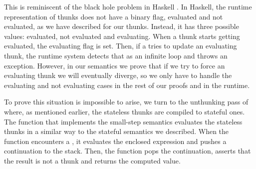 This is reminiscent of the black hole problem in Haskell
\cite{van1999optimising}. In Haskell, the runtime representation of thunks does
not have a binary flag, evaluated and not evaluated, as we have described for
our thunks. Instead, it has three possible values: evaluated, not evaluated and
evaluating. When a thunk starts getting evaluated, the evaluating flag is set.
Then, if a  tries to update an evaluating thunk, the runtime system
detects that as an infinite loop and throws an exception. However, in our
semantics we prove that if we try to force an evaluating thunk we will
eventually diverge, so we only have to handle the evaluating and not evaluating
cases in the rest of our proofs and in the runtime.

To prove this situation is impossible to arise, we turn to the unthunking pass
of \StateLang{} where, as mentioned earlier, the stateless thunks are compiled
to stateful ones. The  function that implements the small-step
semantics evaluates the stateless thunks in a similar way to the stateful
semantics we described. When the  function encounters a ,
it evaluates the enclosed expression and pushes a  continuation to
the stack. Then, the  function pops the continuation, asserts that
the result is not a thunk and returns the computed value.

